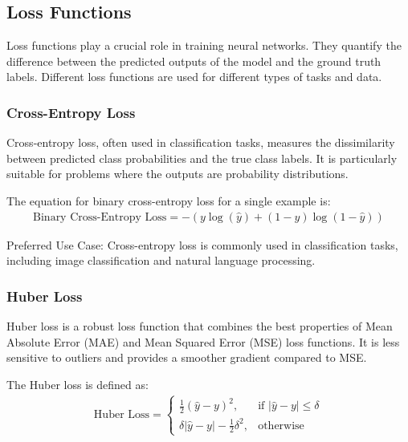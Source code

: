 
\subsection{Loss Functions} \label{loss}

Loss functions play a crucial role in training neural networks. They quantify the difference between the predicted outputs of the model and the ground truth labels. Different loss functions are used for different types of tasks and data.

\subsubsection{Cross-Entropy Loss} \label{sec:crossentropy}

Cross-entropy loss, often used in classification tasks, measures the dissimilarity between predicted class probabilities and the true class labels. It is particularly suitable for problems where the outputs are probability distributions.

The equation for binary cross-entropy loss for a single example is:
\begin{align}
	\text{Binary Cross-Entropy Loss} = -\left(y \log(\hat{y}) + (1 - y) \log(1 - \hat{y})\right)
\end{align}

Preferred Use Case: Cross-entropy loss is commonly used in classification tasks, including image classification and natural language processing.

\subsubsection{Huber Loss}

Huber loss is a robust loss function that combines the best properties of Mean Absolute Error (MAE) and Mean Squared Error (MSE) loss functions. It is less sensitive to outliers and provides a smoother gradient compared to MSE.

The Huber loss is defined as:
\begin{align}
	\text{Huber Loss} = \begin{cases}
		\frac{1}{2}(\hat{y} - y)^2, & \text{if } |\hat{y} - y| \leq \delta \\
		\delta|\hat{y} - y| - \frac{1}{2}\delta^2, & \text{otherwise}
	\end{cases}
\end{align}

